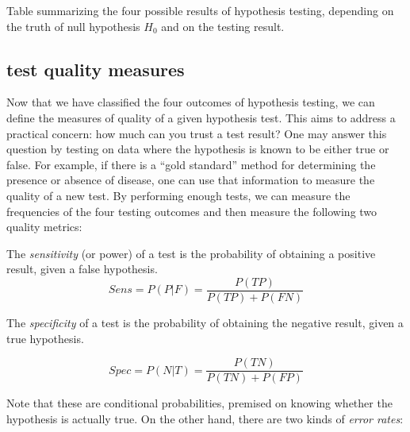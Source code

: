 \documentclass[
  letterpaper,
  DIV=11,
  numbers=noendperiod]{scrreprt}
\begin{document}
Table summarizing the four possible results of hypothesis testing,
depending on the truth of null hypothesis \(H_0\) and on the testing
result.

\hypertarget{test-quality-measures}{%
\subsection{test quality measures}\label{test-quality-measures}}

Now that we have classified the four outcomes of hypothesis testing, we
can define the measures of quality of a given hypothesis test. This aims
to address a practical concern: how much can you trust a test result?
One may answer this question by testing on data where the hypothesis is
known to be either true or false. For example, if there is a ``gold
standard'' method for determining the presence or absence of disease,
one can use that information to measure the quality of a new test. By
performing enough tests, we can measure the frequencies of the four
testing outcomes and then measure the following two quality metrics:

\begin{tcolorbox}[enhanced jigsaw, arc=.35mm, colframe=quarto-callout-note-color-frame, left=2mm, opacitybacktitle=0.6, breakable, title=\textcolor{quarto-callout-note-color}{\faInfo}\hspace{0.5em}{Definition}, toprule=.15mm, coltitle=black, bottomtitle=1mm, toptitle=1mm, colback=white, leftrule=.75mm, colbacktitle=quarto-callout-note-color!10!white, titlerule=0mm, opacityback=0, rightrule=.15mm, bottomrule=.15mm]

The \emph{sensitivity} (or power) of a test is the probability of
obtaining a positive result, given a false hypothesis.
\[ Sens = P(P | F) = \frac{P(TP)}{P(TP) + P(FN)} \]

The \emph{specificity} of a test is the probability of obtaining the
negative result, given a true hypothesis.

\[ Spec = P(N | T) = \frac{P(TN)}{P(TN) + P(FP)} \]

\end{tcolorbox}

Note that these are conditional probabilities, premised on knowing
whether the hypothesis is actually true. On the other hand, there are
two kinds of \emph{error rates}:
\end{document}
